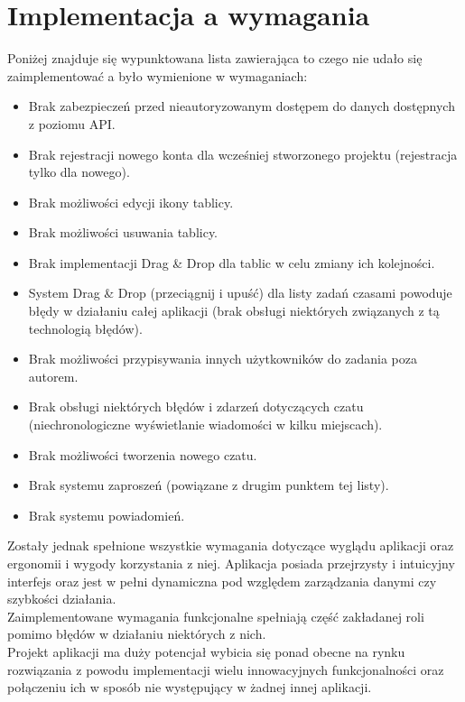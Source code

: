 \documentclass[eng,printmode]{mgr}
\begin{document}
\section{Implementacja a wymagania}
Poniżej znajduje się wypunktowana lista zawierająca to czego nie udało się zaimplementować a było wymienione w wymaganiach:
\begin{itemize}
  \item Brak zabezpieczeń przed nieautoryzowanym dostępem do danych dostępnych z poziomu API.
  \item Brak rejestracji nowego konta dla wcześniej stworzonego projektu (rejestracja tylko dla nowego). 
  \item Brak możliwości edycji ikony tablicy.
  \item Brak możliwości usuwania tablicy.
  \item Brak implementacji Drag \& Drop dla tablic w celu zmiany ich kolejności.
  \item System Drag \& Drop (przeciągnij i upuść) dla listy zadań czasami powoduje błędy w działaniu całej aplikacji (brak obsługi niektórych związanych z tą technologią błędów).
  \item Brak możliwości przypisywania innych użytkowników do zadania poza autorem.
  \item Brak obsługi niektórych błędów i zdarzeń dotyczących czatu (niechronologiczne wyświetlanie wiadomości w kilku miejscach).
  \item Brak możliwości tworzenia nowego czatu.
  \item Brak systemu zaproszeń (powiązane z drugim punktem tej listy).
  \item Brak systemu powiadomień.
\end{itemize}
Zostały jednak spełnione wszystkie wymagania dotyczące wyglądu aplikacji oraz ergonomii i wygody korzystania z niej. Aplikacja posiada przejrzysty i intuicyjny interfejs oraz jest w pełni dynamiczna pod względem zarządzania danymi czy szybkości działania. \\
Zaimplementowane wymagania funkcjonalne spełniają część zakładanej roli pomimo błędów w działaniu niektórych z nich.
\\
Projekt aplikacji ma duży potencjał wybicia się ponad obecne na rynku rozwiązania z powodu implementacji wielu innowacyjnych funkcjonalności oraz połączeniu ich w sposób nie występujący w żadnej innej aplikacji.
\end{document}
